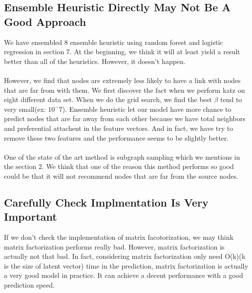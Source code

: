 \documentclass[12pt]{article}
\begin{document}
\subsection{Ensemble Heuristic Directly May Not Be A Good Approach}
We have ensembled 8 ensemble heuristic using random forest and logistic regression in section 7. At the beginning, we think it will at least yield a result better than all of the heuristics. However, it doesn't happen. 
\\ \\
However, we find that nodes are extremely less likely to have a link with nodes that are far from with them. We first discover the fact when we perform katz on eight different data set. When we do the grid search, we find the best $\beta$ tend to very small(ex: $10^-7$). Ensemble heuristic let our model have more chance to predict nodes that are far away from each other because we have total neighbors and preferential attachent in the feature vectors. And in fact, we have try to remove these two features and the performance seems to be slightly better.  
\\ \\
One of the state of the art method is subgraph sampling which we mentions in the section 2. We think that one of the reason this method performs so good could be that it will not recommend nodes that are far from the source nodes. 
\subsection{Carefully Check Implmentation Is Very Important}
If we don't check the implementation of matrix facotorization, we may think matrix factorization performs really bad. However, matrix factorization is actually not that bad. In fact, considering matrix factorization only need O(k)(k is the size of latent vector) time in the prediction, matrix factorization is actually a very good model in practice. It can achieve a decent performance with a good prediction speed.




	
\end{document}
